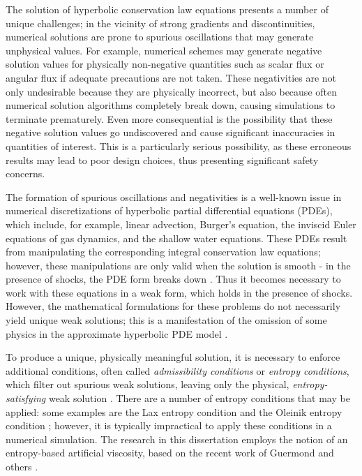 The solution of hyperbolic conservation law equations
presents a number of unique challenges; in the vicinity of strong
gradients and discontinuities, numerical solutions are prone to spurious
oscillations that may generate unphysical values. For example,
numerical schemes may generate negative solution values for physically
non-negative quantities such as scalar flux or angular flux
if adequate precautions are not taken.
These negativities are not only undesirable because they are physically
incorrect, but also because often numerical solution algorithms completely break
down, causing simulations to terminate prematurely. Even more consequential
is the possibility that these negative solution values go undiscovered
and cause significant inaccuracies in quantities of interest.
This is a particularly serious possibility, as these erroneous results may
lead to poor design choices, thus presenting significant safety concerns.

The formation of spurious oscillations and negativities is a well-known issue
in numerical discretizations of hyperbolic partial differential equations (PDEs), which
include, for example, linear advection, Burger's equation, the inviscid Euler
equations of gas dynamics, and the shallow water equations.
These PDEs result from manipulating the corresponding integral conservation law
equations; however, these manipulations are only valid when the solution is
smooth - in the presence of shocks, the PDE form breaks down
\cite{leveque2002}. Thus it becomes necessary to work with these
equations in a weak form, which holds in the presence of shocks.  However, the
mathematical formulations for these problems do not necessarily yield unique
weak solutions; this is a manifestation of the omission of some physics in the
approximate hyperbolic PDE model \cite{leveque2002}.

To produce a unique, physically meaningful solution, it is necessary to
enforce additional conditions, often called \emph{admissibility conditions}
or \emph{entropy conditions}, which filter out spurious weak solutions,
leaving only the physical, \emph{entropy-satisfying} weak solution
\cite{leveque2002}.
There are a number of entropy conditions that may be applied: some
examples are the Lax entropy condition and the Oleinik entropy
condition \cite{leveque2002}; however, it is typically impractical
to apply these conditions in a numerical simulation. The research in this
dissertation employs the notion of an entropy-based artificial viscosity,
based on the recent work of Guermond and others \cite{guermond_ev}.

